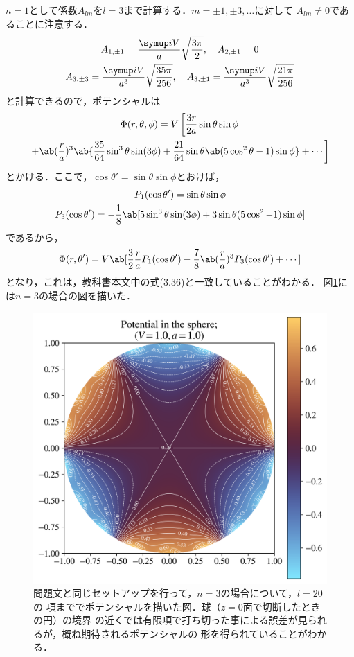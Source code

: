   $n = 1$として係数$A_{lm}$を$l = 3$まで計算する．$m = \pm 1, \pm 3, \ldots$に対して
  $A_{lm} \neq 0$であることに注意する．
  \begin{gather*}%
    A_{1,\pm 1} = \frac{\i V}{a}\sqrt{\frac{3\pi}{2}},\qq
    A_{2,\pm 1} = 0\\
    A_{3,\pm 3} = \frac{\i V}{a^3} \sqrt{\frac{35\pi}{256}},\qq
    A_{3,\pm 1} = \frac{\i V}{a^3} \sqrt{\frac{21\pi}{256}}
  \end{gather*}%
  と計算できるので，ポテンシャルは
  \begin{multline}%
    \Phi(r,\theta,\phi) = V\left[
      \frac{3r}{2a} \sin\theta\sin\phi\right.  \\
      \left.
      +
      \ab(\frac{r}{a})^3\ab\{
        \frac{35}{64}\sin^3\theta\sin(3\phi) + 
        \frac{21}{64}\sin\theta\ab(5\cos^2\theta-1)\sin\phi
      \} + \cdots
    \right]
  \end{multline}%
  とかける．ここで，$\cos\theta' = \sin\theta \sin\phi$とおけば，
  \begin{gather}%
    P_1(\cos\theta') = \sin\theta\sin\phi\\
    P_3(\cos\theta') = -\frac{1}{8}\ab[5\sin^3\theta\sin(3\phi) 
    + 3\sin\theta(5\cos^2-1)\sin\phi]
  \end{gather}%
  であるから，
  \begin{gather}%
    \Phi(r,\theta') = V\ab[\frac{3}{2} \frac ra P_1(\cos\theta') - 
    \frac{7}{8}\ab(\frac ra)^3P_3(\cos\theta') + \cdots]
  \end{gather}%
  となり，これは，教科書本文中の式(3.36)と一致していることがわかる．
  図\ref{fig:3-4_n3}には$n = 3$の場合の図を描いた．
  \begin{figure}[H]%
    \centering%
    \includegraphics[width=0.8\linewidth]{py/3-4_n3.png}%
    \caption{問題文と同じセットアップを行って，$n = 3$の場合について，$l = 20$の
    項まででポテンシャルを描いた図．球（$z = 0$面で切断したときの円）の境界
    の近くでは有限項で打ち切った事による誤差が見られるが，概ね期待されるポテンシャルの
    形を得られていることがわかる．}%
    \label{fig:3-4_n3}%
  \end{figure}%

